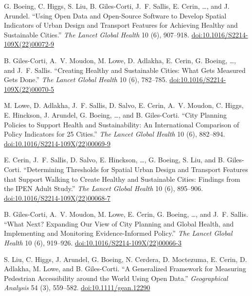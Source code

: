 \documentclass[11pt,a4paper]{report} %
\begin{document}
\begin{tablist}
\item[2022] \tab{}G. Boeing, C. Higgs, S. Liu, B. Giles-Corti, J.~F. Sallis, E. Cerin, \ldots, and J. Arundel. \enquote{Using Open Data and Open-Source Software to Develop Spatial Indicators of Urban Design and Transport Features for Achieving Healthy and Sustainable Cities.} \textit{The Lancet Global Health} 10 (6), 907--918. \href{https://doi.org/10.1016/S2214-109X(22)00072-9}{doi:10.1016/S2214-109X(22)00072-9}

\item[2022] \tab{}B. Giles-Corti, A.~V. Moudon, M. Lowe, D. Adlakha, E. Cerin, G. Boeing, \ldots, and J.~F. Sallis. \enquote{Creating Healthy and Sustainable Cities: What Gets Measured Gets Done.} \textit{The Lancet Global Health} 10 (6), 782--785. \href{https://doi.org/10.1016/S2214-109X(22)00070-5}{doi:10.1016/S2214-109X(22)00070-5}

\item[2022] \tab{}M. Lowe, D. Adlakha, J.~F. Sallis, D. Salvo, E. Cerin, A.~V. Moudon, C. Higgs, E. Hinckson, J. Arundel, G. Boeing, \ldots, and B. Giles-Corti. \enquote{City Planning Policies to Support Health and Sustainability: An International Comparison of Policy Indicators for 25 Cities.} \textit{The Lancet Global Health} 10 (6), 882--894. \href{https://doi.org/10.1016/S2214-109X(22)00069-9}{doi:10.1016/S2214-109X(22)00069-9}

\item[2022] \tab{}E. Cerin, J.~F. Sallis, D. Salvo, E. Hinckson, \ldots, G. Boeing, S. Liu, and B. Giles-Corti. \enquote{Determining Thresholds for Spatial Urban Design and Transport Features that Support Walking to Create Healthy and Sustainable Cities: Findings from the IPEN Adult Study.} \textit{The Lancet Global Health} 10 (6), 895--906. \href{https://doi.org/10.1016/S2214-109X(22)00068-7}{doi:10.1016/S2214-109X(22)00068-7}

\item[2022] \tab{}B. Giles-Corti, A.~V. Moudon, M. Lowe, E. Cerin, G. Boeing, \ldots, and J.~F. Sallis. \enquote{What Next? Expanding Our View of City Planning and Global Health, and Implementing and Monitoring Evidence-Informed Policy.} \textit{The Lancet Global Health} 10 (6), 919--926. \href{https://doi.org/10.1016/S2214-109X(22)00066-3}{doi:10.1016/S2214-109X(22)00066-3}

\item[2022] \tab{}S. Liu, C. Higgs, J. Arundel, G. Boeing, N. Cerdera, D. Moctezuma, E. Cerin, D. Adlakha, M. Lowe, and B. Giles-Corti. \enquote{A Generalized Framework for Measuring Pedestrian Accessibility around the World Using Open Data.} \textit{Geographical Analysis} 54 (3), 559--582. \href{https://doi.org/10.1111/gean.12290}{doi:10.1111/gean.12290}


\end{tablist}
\end{document}
